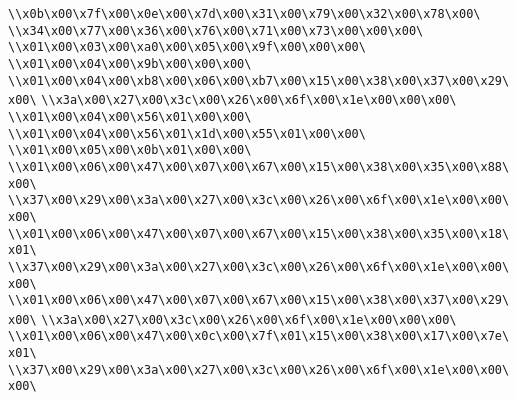 \verb|\\x0b\x00\x7f\x00\x0e\x00\x7d\x00\x31\x00\x79\x00\x32\x00\x78\x00\|\newline
\verb|\\x34\x00\x77\x00\x36\x00\x76\x00\x71\x00\x73\x00\x00\x00\|\newline
\verb|\\x01\x00\x03\x00\xa0\x00\x05\x00\x9f\x00\x00\x00\|\newline
\verb|\\x01\x00\x04\x00\x9b\x00\x00\x00\|\newline
\verb|\\x01\x00\x04\x00\xb8\x00\x06\x00\xb7\x00\x15\x00\x38\x00\x37\x00\x29\x00\|\newline
\verb|\\x3a\x00\x27\x00\x3c\x00\x26\x00\x6f\x00\x1e\x00\x00\x00\|\newline
\verb|\\x01\x00\x04\x00\x56\x01\x00\x00\|\newline
\verb|\\x01\x00\x04\x00\x56\x01\x1d\x00\x55\x01\x00\x00\|\newline
\verb|\\x01\x00\x05\x00\x0b\x01\x00\x00\|\newline
\verb|\\x01\x00\x06\x00\x47\x00\x07\x00\x67\x00\x15\x00\x38\x00\x35\x00\x88\x00\|\newline
\verb|\\x37\x00\x29\x00\x3a\x00\x27\x00\x3c\x00\x26\x00\x6f\x00\x1e\x00\x00\x00\|\newline
\verb|\\x01\x00\x06\x00\x47\x00\x07\x00\x67\x00\x15\x00\x38\x00\x35\x00\x18\x01\|\newline
\verb|\\x37\x00\x29\x00\x3a\x00\x27\x00\x3c\x00\x26\x00\x6f\x00\x1e\x00\x00\x00\|\newline
\verb|\\x01\x00\x06\x00\x47\x00\x07\x00\x67\x00\x15\x00\x38\x00\x37\x00\x29\x00\|\newline
\verb|\\x3a\x00\x27\x00\x3c\x00\x26\x00\x6f\x00\x1e\x00\x00\x00\|\newline
\verb|\\x01\x00\x06\x00\x47\x00\x0c\x00\x7f\x01\x15\x00\x38\x00\x17\x00\x7e\x01\|\newline
\verb|\\x37\x00\x29\x00\x3a\x00\x27\x00\x3c\x00\x26\x00\x6f\x00\x1e\x00\x00\x00\|\newline
